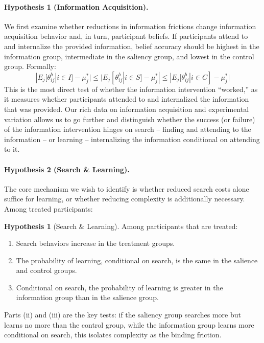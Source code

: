 \documentclass[12pt]{article}
\theoremstyle{definition}
\newtheorem{hypothesis}{Hypothesis}
\theoremstyle{remark}
\begin{document}
\paragraph{Hypothesis 1 (Information Acquisition).}
We first examine whether reductions in information frictions change information acquisition behavior and, in turn, participant beliefs. If participants attend to and internalize the provided information, belief accuracy should be highest in the information group, intermediate in the saliency group, and lowest in the control group. Formally:
$$|E_j[\theta^b_{ij} | i \in I] - \mu^*_j| \leq |E_j[\theta^b_{ij} | i \in S] - \mu^*_j| \leq |E_j[\theta^b_{ij} | i \in C] - \mu^*_j|$$
This is the most direct test of whether the information intervention ``worked,'' as it measures whether participants attended to and internalized the information that was provided. Our rich data on information acquisition and experimental variation allows us to go further and distinguish whether the success (or failure) of the information intervention hinges on search -- finding and attending to the information -- or learning -- internalizing the information conditional on attending to it. 

\paragraph{Hypothesis 2 (Search \& Learning).}
The core mechanism we wish to identify is whether reduced search costs alone suffice for learning, or whether reducing complexity is additionally necessary. Among treated participants:
\begin{hypothesis}[Search \& Learning]\label{hyp:info_by_group}
Among participants that are treated:
\begin{enumerate}[label=(\roman*)]
\item Search behaviors increase in the treatment groups.
\item The probability of learning, conditional on search, is the same in the salience and control groups.
\item Conditional on search, the probability of learning is greater in the information group than in the salience group.
\end{enumerate}
\end{hypothesis}
Parts (ii) and (iii) are the key tests: if the saliency group searches more but learns no more than the control group, while the information group learns more conditional on search, this isolates complexity as the binding friction.
\end{document}
